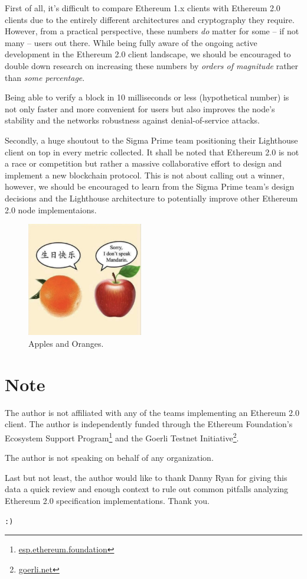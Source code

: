 \documentclass[twoside,twocolumn]{article}
\begin{document}
First of all, it's difficult to compare Ethereum 1.x clients with Ethereum 2.0 clients due to the entirely different architectures and cryptography they require. However, from a practical perspective, these numbers \textit{do} matter for some -- if not many -- users out there. While being fully aware of the ongoing active development in the Ethereum 2.0 client landscape, we should be encouraged to double down research on increasing these numbers by \textit{orders of magnitude} rather than \textit{some percentage}.\par

Being able to verify a block in 10 milliseconds or less (hypothetical number) is not only faster and more convenient for users but also improves the node's stability and the networks robustness against denial-of-service attacks.\par

Secondly, a huge shoutout to the Sigma Prime team positioning their Lighthouse client on top in every metric collected. It shall be noted that Ethereum 2.0 is not a race or competition but rather a massive collaborative effort to design and implement a new blockchain protocol. This is not about calling out a winner, however, we should be encouraged to learn from the Sigma Prime team's design decisions and the Lighthouse architecture to potentially improve other Ethereum 2.0 node implementaions.\par

\begin{figure}[t]
	\centering
	\includegraphics[width=0.45\textwidth]{../res/vegies.png}
	\caption{Apples and Oranges.}
	\label{img:meme}
\end{figure}

\vspace{\fill}

\section*{Note}
The author is not affiliated with any of the teams implementing an Ethereum 2.0 client. The author is independently funded through the Ethereum Foundation's Ecosystem Support Program\footnote{\href{https://esp.ethereum.foundation}{esp.ethereum.foundation}} and the Goerli Testnet Initiative\footnote{\href{https://goerli.net}{goerli.net}}.\par

The author is not speaking on behalf of any organization.\par

Last but not least, the author would like to thank Danny Ryan for giving this data a quick review and enough context to rule out common pitfalls analyzing Ethereum 2.0 specification implementations. Thank you.\par

\texttt{:)}
\end{document}
